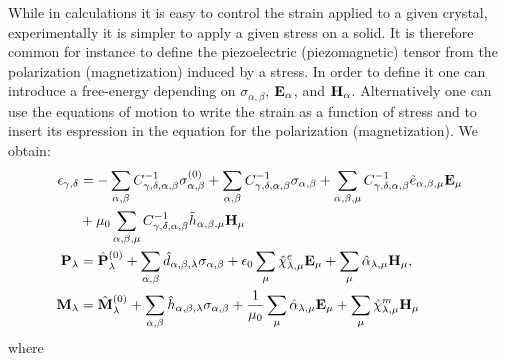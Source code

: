 \documentclass[12pt,a4paper,twoside]{report}
\begin{document}
While in calculations it is easy to control the strain applied to
a given crystal, experimentally it is simpler to apply a given stress
on a solid. It is therefore common for instance to define the 
piezoelectric (piezomagnetic) tensor from the polarization 
(magnetization) induced by a stress. In order to define it one 
can introduce a free-energy depending on $\sigma_{\alpha,\beta}$,
${\bf E}_\alpha$, and ${\bf H}_\alpha$. Alternatively one can use the
equations of motion to write the strain as a function of stress and
to insert its espression in the equation for the polarization
(magnetization). We obtain:
\begin{align}
\epsilon_{\gamma,\delta} &= 
- \sum_{\alpha,\beta} 
C^{-1}_{\gamma,\delta,\alpha,\beta} \sigma^{(0)}_{\alpha,\beta} 
+ \sum_{\alpha,\beta} 
C^{-1}_{\gamma,\delta,\alpha,\beta} \sigma_{\alpha,\beta} 
+ \sum_{\alpha,\beta,\mu} 
C^{-1}_{\gamma,\delta,\alpha,\beta} \tilde e_{\alpha,\beta,\mu} {\bf E}_\mu 
\nonumber \\
&+ \mu_0 \sum_{\alpha,\beta,\mu} 
C^{-1}_{\gamma,\delta,\alpha,\beta} \tilde h_{\alpha,\beta,\mu} {\bf H}_\mu 
\\
{\bf P}_{\lambda}&= \hat {\bf P}^{(0)}_{\lambda}
+\sum_{\alpha,\beta} \hat d_{\alpha,\beta,\lambda} 
\sigma_{\alpha,\beta} +
\epsilon_0 \sum_{\mu} 
\hat \chi^e_{\lambda,\mu}
{\bf E}_{\mu} +
\sum_{\mu} \hat \alpha_{\lambda,\mu} 
{\bf H}_{\mu}, \\
{\bf M}_{\lambda}&= \hat {\bf M}^{(0)}_{\lambda}
+\sum_{\alpha,\beta} \hat h_{\alpha,\beta,\lambda} 
\sigma_{\alpha,\beta} +
{1\over \mu_0} \sum_{\mu} \hat \alpha_{\lambda,\mu} 
{\bf E}_{\mu}+
\sum_{\mu} 
\hat \chi^m_{\lambda,\mu}
{\bf H}_{\mu}
\end{align} 
where
\end{document}
